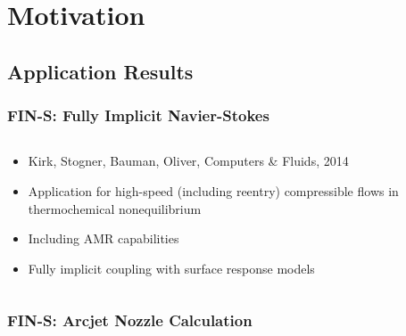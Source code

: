 \section{Motivation}
\subsection{Application Results}



\frame
{
  \Large
  \begin{block}{}
  \end{block}
}



\frame
{
  \frametitle{FIN-S: Fully Implicit Navier-Stokes}

  \begin{columns}
    \begin{column}{0.45\textwidth}
      \begin{itemize}
      \item Kirk, Stogner, Bauman, Oliver, Computers \& Fluids, 2014
      \item Application for high-speed (including reentry)
        compressible flows in thermochemical nonequilibrium
      \item Including AMR capabilities
      \item Fully implicit coupling with surface response models
      \end{itemize}
    \end{column}
    \begin{column}{0.45\textwidth}
      \begin{center}
      \end{center}
    \end{column}
  \end{columns}
}
\frame
{
  \frametitle{FIN-S: Arcjet Nozzle Calculation}
  \begin{center}
      
    
    
  \end{center}
}



